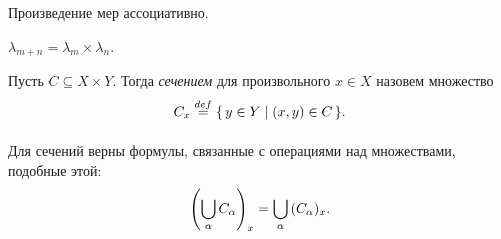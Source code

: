 \begin{theorem}
    Произведение мер ассоциативно.
\end{theorem}

\begin{theorem}
    $\lambda_{m + n} = \lambda_{m} \times \lambda_{n}$.
\end{theorem}

\begin{definition}
    Пусть $C \subseteq X \times Y$. Тогда \textit{сечением} для произвольного $x \in X$
    назовем множество
    \[
        C_x \overset{def}{\underset{}{=}} \{\,y \in Y \mid (x, y) \in C\,\}
    .\] 
\end{definition}

\begin{remark}
    Для сечений верны формулы, связанные с операциями над множествами,
    подобные этой:
    \[
        \left(\bigcup_{\alpha}{C_{\alpha}}\right)_x = \bigcup_{\alpha}{(C_{\alpha})_x}
    .\] 
\end{remark}


